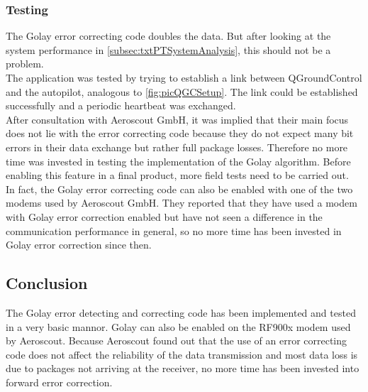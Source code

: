 \subsubsection{Testing}
The Golay error correcting code doubles the data. But after looking at the system performance in \autoref{subsec:txtPTSystemAnalysis}, this should not be a problem.\\
The application was tested by trying to establish a link between QGroundControl and the autopilot, analogous to \autoref{fig:picQGCSetup}. The link could be established successfully and a periodic heartbeat was exchanged.\\
After consultation with Aeroscout GmbH, it was implied that their main focus does not lie with the error correcting code because they do not expect many bit errors in their data exchange but rather full package losses. Therefore no more time was invested in testing the implementation of the Golay algorithm. Before enabling this feature in a final product, more field tests need to be carried out.\\
In fact, the Golay error correcting code can also be enabled with one of the two modems used by Aeroscout GmbH. They reported that they have used a modem with Golay error correction enabled but have not seen a difference in the communication performance in general, so no more time has been invested in Golay error correction since then. 
%
\subsection{Conclusion}
The Golay error detecting and correcting code has been implemented and tested in a very basic mannor. Golay can also be enabled on the RF900x modem used by Aeroscout. Because Aeroscout found out that the use of an error correcting code does not affect the reliability of the data transmission and most data loss is due to packages not arriving at the receiver, no more time has been invested into forward error correction.
%
%
%
%
